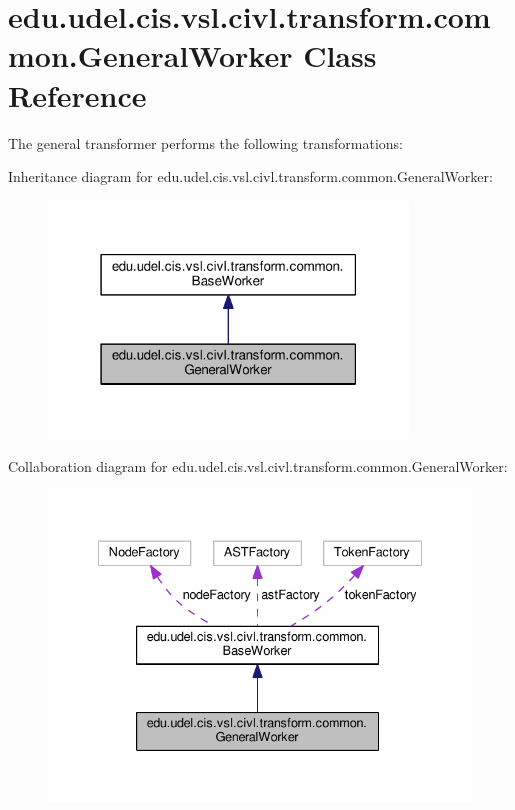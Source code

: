 \hypertarget{classedu_1_1udel_1_1cis_1_1vsl_1_1civl_1_1transform_1_1common_1_1GeneralWorker}{}\section{edu.\+udel.\+cis.\+vsl.\+civl.\+transform.\+common.\+General\+Worker Class Reference}
\label{classedu_1_1udel_1_1cis_1_1vsl_1_1civl_1_1transform_1_1common_1_1GeneralWorker}


The general transformer performs the following transformations\+:  




Inheritance diagram for edu.\+udel.\+cis.\+vsl.\+civl.\+transform.\+common.\+General\+Worker\+:
\nopagebreak
\begin{figure}[H]
\begin{center}
\leavevmode
\includegraphics[width=271pt]{classedu_1_1udel_1_1cis_1_1vsl_1_1civl_1_1transform_1_1common_1_1GeneralWorker__inherit__graph}
\end{center}
\end{figure}


Collaboration diagram for edu.\+udel.\+cis.\+vsl.\+civl.\+transform.\+common.\+General\+Worker\+:
\nopagebreak
\begin{figure}[H]
\begin{center}
\leavevmode
\includegraphics[width=335pt]{classedu_1_1udel_1_1cis_1_1vsl_1_1civl_1_1transform_1_1common_1_1GeneralWorker__coll__graph}
\end{center}
\end{figure}
